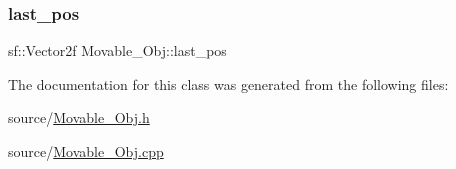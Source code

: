 \mbox{\label{classMovable__Obj_a934c481705983ca09c153d0cd65e4e1a}} 
\subsubsection{\texorpdfstring{last\+\_\+pos}{last\_pos}}
{\footnotesize\ttfamily sf\+::\+Vector2f Movable\+\_\+\+Obj\+::last\+\_\+pos\hspace{0.3cm}{\ttfamily [protected]}}



The documentation for this class was generated from the following files\+:\begin{DoxyCompactItemize}
\item 
source/\hyperlink{Movable__Obj_8h}{Movable\+\_\+\+Obj.\+h}\item 
source/\hyperlink{Movable__Obj_8cpp}{Movable\+\_\+\+Obj.\+cpp}\end{DoxyCompactItemize}
